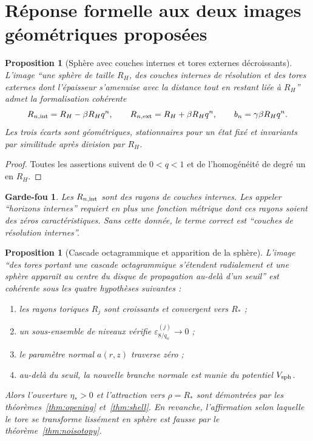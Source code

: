 \documentclass[11pt,a4paper]{article}
\newtheorem{proposition}[theorem]{Proposition}
\newtheorem{guardrail}[theorem]{Garde-fou}
\newcommand{\eps}{\varepsilon}
\begin{document}
\section{Réponse formelle aux deux images géométriques proposées}

\begin{proposition}[Sphère avec couches internes et tores externes décroissants]\label{prop:user-upper}
L'image ``une sphère de taille $R_H$, des couches internes de résolution et des tores externes dont l'épaisseur s'amenuise avec la distance tout en restant liée à $R_H$'' admet la formalisation cohérente
\[
 R_{n,\rm int}=R_H-\beta R_Hq^n,
 \qquad
 R_{n,\rm ext}=R_H+\beta R_Hq^n,
 \qquad
 b_n=\gamma\beta R_Hq^n.
\]
Les trois écarts sont géométriques, stationnaires pour un état fixé et invariants par similitude après division par $R_H$.
\end{proposition}

\begin{proof}
Toutes les assertions suivent de $0<q<1$ et de l'homogénéité de degré un en $R_H$.
\end{proof}

\begin{guardrail}
Les $R_{n,\rm int}$ sont des rayons de couches internes. Les appeler ``horizons internes'' requiert en plus une fonction métrique dont ces rayons soient des zéros caractéristiques. Sans cette donnée, le terme correct est ``couches de résolution internes''.
\end{guardrail}

\begin{proposition}[Cascade octagrammique et apparition de la sphère]\label{prop:user-lower}
L'image ``des tores portant une cascade octagrammique s'étendent radialement et une sphère apparaît au centre du disque de propagation au-delà d'un seuil'' est cohérente sous les quatre hypothèses suivantes :
\begin{enumerate}[label=\textup{(\roman*)}]
\item les rayons toriques $R_j$ sont croissants et convergent vers $R_*$ ;
\item un sous-ensemble de niveaux vérifie $\eps_{8/q_o}^{(j)}\to0$ ;
\item le paramètre normal $a(r,z)$ traverse zéro ;
\item au-delà du seuil, la nouvelle branche normale est munie du potentiel $V_{\rm sph}$.
\end{enumerate}
Alors l'ouverture $\eta_*>0$ et l'attraction vers $\rho=R_*$ sont démontrées par les théorèmes~\ref{thm:opening} et~\ref{thm:shell}. En revanche, l'affirmation selon laquelle le tore se transforme lissément en sphère est fausse par le théorème~\ref{thm:noisotopy}.
\end{proposition}
\end{document}
